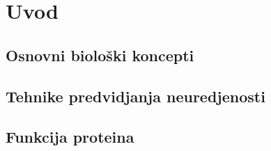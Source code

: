
\chapter{Uvod} %

\label{Uvod} %



\section{Osnovni biološki koncepti}



\section{Tehnike predvidjanja neuredjenosti}



\section{Funkcija proteina}
